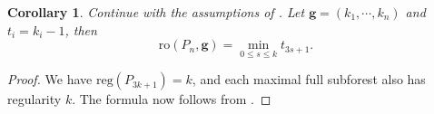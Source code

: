\documentclass[dvipsnames,10pt]{article}
\newtheorem{cor}[theorem]{Corollary}
\begin{document}
\begin{cor}
    Continue with the assumptions of . Let $\mathbf{g}=(k_1,\cdots,k_n)$ and $t_i=k_i-1$, then
    \begin{equation*}
        \mathrm{ro}(P_n,\mathbf{g}) = \min_{0\leq s\leq k}t_{3s+1}.
    \end{equation*}
\end{cor}

\begin{proof}
    We have $\mathrm{reg}(P_{3k+1})=k$, and each maximal full subforest also has regularity $k$. The formula now follows from .
\end{proof}



\end{document}

